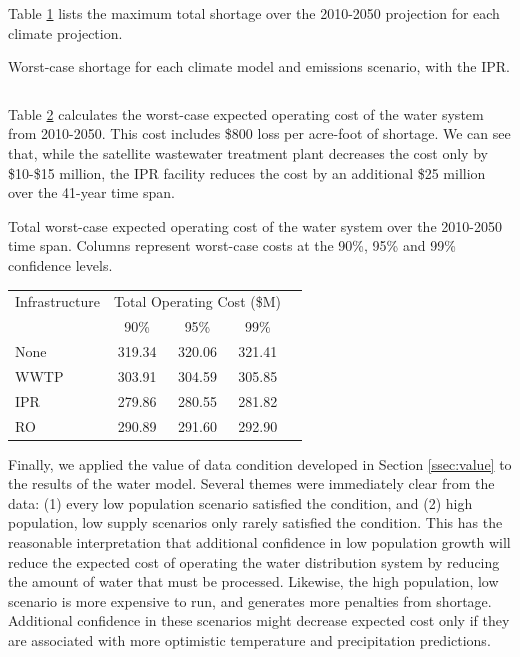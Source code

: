 \documentclass[opre,nonblindrev]{informs3} %
\begin{document}
Table \ref{tb:shortage_model_emission_kl} lists the maximum total shortage over the 2010-2050 projection for each climate projection.

\begin{table}
	\TABLE
	{
		Worst-case shortage for each climate model and emissions scenario, with the IPR.
		\label{tb:shortage_model_emission_kl}
	}
	{\begin{tabular}{l|cccc|c}
		
	 \end{tabular}}
	{}
\end{table}

Table \ref{tb:total_cost} calculates the worst-case expected operating cost of the water system from 2010-2050.
This cost includes \$800 loss per acre-foot of shortage.
We can see that, while the satellite wastewater treatment plant decreases the cost only by \$10-\$15 million, the IPR facility reduces the cost by an additional \$25 million over the 41-year time span.

\begin{table}
	\TABLE
	{
		Total worst-case expected operating cost of the water system over the 2010-2050 time span.
		Columns represent worst-case costs at the 90\%, 95\% and 99\% confidence levels.
		\label{tb:total_cost}
	}
	{\begin{tabular}{l|cccc}
		Infrastructure & \multicolumn{3}{c}{Total Operating Cost (\$M)} \\
		     & 90\%   & 95\%   & 99\% \\
		\hline
		None & 319.34 & 320.06 & 321.41 \\
		WWTP & 303.91 & 304.59 & 305.85 \\
		IPR  & 279.86 & 280.55 & 281.82 \\
		RO   & 290.89 & 291.60 & 292.90
	 \end{tabular}}
	{}
\end{table}

Finally, we applied the value of data condition developed in Section \ref{ssec:value} to the results of the water model.
Several themes were immediately clear from the data: (1) every low population scenario satisfied the condition, and (2) high population, low supply scenarios only rarely satisfied the condition.
This has the reasonable interpretation that additional confidence in low population growth will reduce the expected cost of operating the water distribution system by reducing the amount of water that must be processed.
Likewise, the high population, low scenario is more expensive to run, and generates more penalties from shortage.
Additional confidence in these scenarios might decrease expected cost only if they are associated with more optimistic temperature and precipitation predictions.
\end{document}
